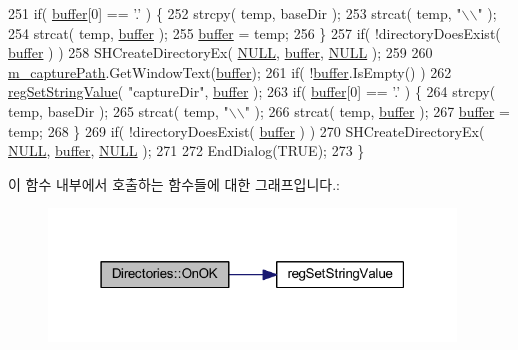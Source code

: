 \begin{DoxyCode}
251     \textcolor{keywordflow}{if}( \mbox{\hyperlink{_g_b_a_8cpp_a28d4d3d8445e73a696b2d6f7eadabd96}{buffer}}[0] == \textcolor{charliteral}{'.'} ) \{
252         strcpy( temp, baseDir );
253         strcat( temp, \textcolor{stringliteral}{"\(\backslash\)\(\backslash\)"} );
254         strcat( temp, \mbox{\hyperlink{_g_b_a_8cpp_a28d4d3d8445e73a696b2d6f7eadabd96}{buffer}} );
255         \mbox{\hyperlink{_g_b_a_8cpp_a28d4d3d8445e73a696b2d6f7eadabd96}{buffer}} = temp;
256     \}
257     \textcolor{keywordflow}{if}( !directoryDoesExist( \mbox{\hyperlink{_g_b_a_8cpp_a28d4d3d8445e73a696b2d6f7eadabd96}{buffer}} ) )
258         SHCreateDirectoryEx( \mbox{\hyperlink{getopt1_8c_a070d2ce7b6bb7e5c05602aa8c308d0c4}{NULL}}, \mbox{\hyperlink{_g_b_a_8cpp_a28d4d3d8445e73a696b2d6f7eadabd96}{buffer}}, \mbox{\hyperlink{getopt1_8c_a070d2ce7b6bb7e5c05602aa8c308d0c4}{NULL}} );
259 
260     \mbox{\hyperlink{class_directories_a4010cf261f54e1477c6587395fd055d4}{m\_capturePath}}.GetWindowText(\mbox{\hyperlink{_g_b_a_8cpp_a28d4d3d8445e73a696b2d6f7eadabd96}{buffer}});
261     \textcolor{keywordflow}{if}( !\mbox{\hyperlink{_g_b_a_8cpp_a28d4d3d8445e73a696b2d6f7eadabd96}{buffer}}.IsEmpty() )
262         \mbox{\hyperlink{_reg_8cpp_a37fa244e34332f058ba14f206dc7e0ea}{regSetStringValue}}( \textcolor{stringliteral}{"captureDir"}, \mbox{\hyperlink{_g_b_a_8cpp_a28d4d3d8445e73a696b2d6f7eadabd96}{buffer}} );
263     \textcolor{keywordflow}{if}( \mbox{\hyperlink{_g_b_a_8cpp_a28d4d3d8445e73a696b2d6f7eadabd96}{buffer}}[0] == \textcolor{charliteral}{'.'} ) \{
264         strcpy( temp, baseDir );
265         strcat( temp, \textcolor{stringliteral}{"\(\backslash\)\(\backslash\)"} );
266         strcat( temp, \mbox{\hyperlink{_g_b_a_8cpp_a28d4d3d8445e73a696b2d6f7eadabd96}{buffer}} );
267         \mbox{\hyperlink{_g_b_a_8cpp_a28d4d3d8445e73a696b2d6f7eadabd96}{buffer}} = temp;
268     \}
269     \textcolor{keywordflow}{if}( !directoryDoesExist( \mbox{\hyperlink{_g_b_a_8cpp_a28d4d3d8445e73a696b2d6f7eadabd96}{buffer}} ) )
270         SHCreateDirectoryEx( \mbox{\hyperlink{getopt1_8c_a070d2ce7b6bb7e5c05602aa8c308d0c4}{NULL}}, \mbox{\hyperlink{_g_b_a_8cpp_a28d4d3d8445e73a696b2d6f7eadabd96}{buffer}}, \mbox{\hyperlink{getopt1_8c_a070d2ce7b6bb7e5c05602aa8c308d0c4}{NULL}} );
271 
272     EndDialog(TRUE);
273 \}
\end{DoxyCode}
이 함수 내부에서 호출하는 함수들에 대한 그래프입니다.\+:
\nopagebreak
\begin{figure}[H]
\begin{center}
\leavevmode
\includegraphics[width=307pt]{class_directories_aabe175a096e8718818d7bca6bd6cd455_cgraph}
\end{center}
\end{figure}
\mbox{\label{class_directories_a0ed6f361bde84a4a6a37c41582a929ec}} 
